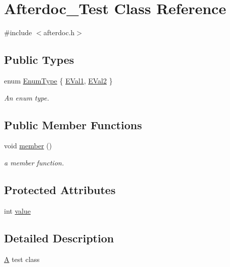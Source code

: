 \hypertarget{class_afterdoc___test}{}\section{Afterdoc\+\_\+\+Test Class Reference}
\label{class_afterdoc___test}


{\ttfamily \#include $<$afterdoc.\+h$>$}

\subsection*{Public Types}
\begin{DoxyCompactItemize}
\item 
enum \mbox{\hyperlink{class_afterdoc___test_adab0cd7ad3b4875e245ca8f6238a388a}{Enum\+Type}} \{ \mbox{\hyperlink{class_afterdoc___test_adab0cd7ad3b4875e245ca8f6238a388aae054276790e35692ad0abe10c5b75da4}{E\+Val1}}, 
\mbox{\hyperlink{class_afterdoc___test_adab0cd7ad3b4875e245ca8f6238a388aac849f37624d8d2d68ca72c4a8df9cf99}{E\+Val2}}
 \}
\begin{DoxyCompactList}\small\item\em An enum type. \end{DoxyCompactList}\end{DoxyCompactItemize}
\subsection*{Public Member Functions}
\begin{DoxyCompactItemize}
\item 
void \mbox{\hyperlink{class_afterdoc___test_a57ba94e9039ee90a1b191ae0009a05dd}{member}} ()
\begin{DoxyCompactList}\small\item\em a member function. \end{DoxyCompactList}\end{DoxyCompactItemize}
\subsection*{Protected Attributes}
\begin{DoxyCompactItemize}
\item 
int \mbox{\hyperlink{class_afterdoc___test_a9287a08830e5cdfd9c732bb7932694a0}{value}}
\end{DoxyCompactItemize}


\subsection{Detailed Description}
\mbox{\hyperlink{class_a}{A}} test class 

